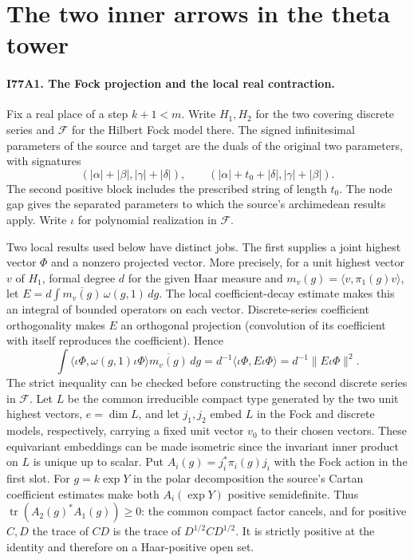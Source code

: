 \section{The two inner arrows in the theta tower}

\paragraph{I77A1. The Fock projection and the local real contraction.}
Fix a real place of a step $k+1<m$. Write $H_1,H_2$ for the two
covering discrete series and $\mathcal F$ for the Hilbert Fock model
there. The signed infinitesimal parameters of the source and target
are the duals of the original two parameters, with signatures
\[
 (|\alpha|+|\beta|,|\gamma|+|\delta|),\qquad
 (|\alpha|+t_0+|\delta|,|\gamma|+|\beta|).
\]
The second positive block includes the prescribed string of length
$t_0$. The node gap gives the separated parameters to which the
source's archimedean results apply. Write $\iota$ for polynomial
realization in $\mathcal F$.

Two local results used below have distinct jobs. The first supplies a
joint highest vector $\Phi$ and a nonzero projected vector. More
precisely, for a unit highest vector $v$ of $H_1$, formal degree $d$
for the given Haar measure and $m_v(g)=\langle v,\pi_1(g)v\rangle$,
let $E=d\int\overline{m_v(g)}\,\omega(g,1)\,dg$. The local
coefficient-decay estimate makes this an integral of bounded operators
on each vector. Discrete-series coefficient orthogonality makes $E$
an orthogonal projection (convolution of its coefficient with itself
reproduces the coefficient). Hence
\[
 \int \langle\iota\Phi,\omega(g,1)\iota\Phi\rangle
                  \overline{m_v(g)}\,dg
        =d^{-1}\langle\iota\Phi,E\iota\Phi\rangle
        =d^{-1}\|E\iota\Phi\|^2 .
\]
The strict inequality can be checked before constructing the second
discrete series in $\mathcal F$. Let $L$ be the common irreducible
compact type generated by the two unit highest vectors,
$e=\dim L$, and let $j_1,j_2$ embed $L$ in the Fock and discrete
models, respectively, carrying a fixed unit vector $v_0$ to their
chosen vectors. These equivariant embeddings can be made isometric
since the invariant inner product on $L$ is unique up to scalar.
Put $A_i(g)=j_i^*\pi_i(g)j_i$ with the Fock action in the first
slot. For $g=k\exp Y$ in the polar decomposition the source's
Cartan coefficient estimates make both $A_i(\exp Y)$ positive
semidefinite. Thus
$\operatorname{tr}(A_2(g)^* A_1(g))\ge0$: the common compact factor
cancels, and for positive $C,D$ the trace of $CD$ is the trace of
$D^{1/2}CD^{1/2}$. It is strictly positive at the identity and
therefore on a Haar-positive open set.

